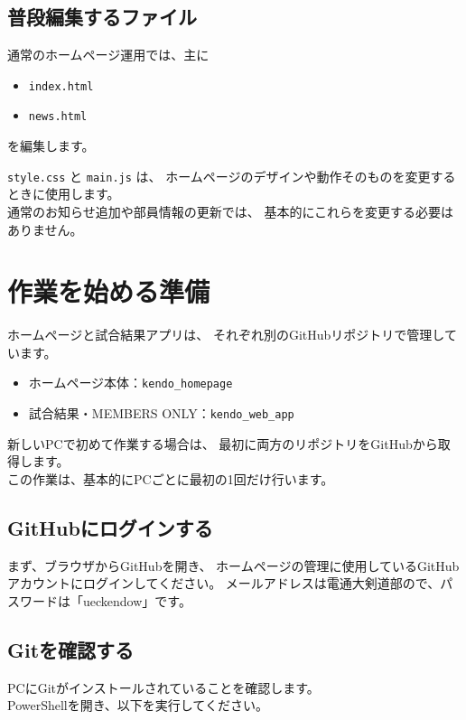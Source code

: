 \documentclass[a4paper,11pt]{ltjsarticle}
\begin{document}
\subsection{普段編集するファイル}

通常のホームページ運用では、主に

\begin{itemize}
  \item \texttt{index.html}
  \item \texttt{news.html}
\end{itemize}

を編集します。

\texttt{style.css} と \texttt{main.js} は、
ホームページのデザインや動作そのものを変更するときに使用します。\\
通常のお知らせ追加や部員情報の更新では、
基本的にこれらを変更する必要はありません。

\section{作業を始める準備}

ホームページと試合結果アプリは、
それぞれ別のGitHubリポジトリで管理しています。

\begin{itemize}
  \item ホームページ本体：\texttt{kendo\_homepage}
  \item 試合結果・MEMBERS ONLY：\texttt{kendo\_web\_app}
\end{itemize}

新しいPCで初めて作業する場合は、
最初に両方のリポジトリをGitHubから取得します。\\
この作業は、基本的にPCごとに最初の1回だけ行います。

\subsection{GitHubにログインする}

まず、ブラウザからGitHubを開き、 
ホームページの管理に使用しているGitHubアカウントにログインしてください。
メールアドレスは電通大剣道部ので、パスワードは「ueckendow」です。

\subsection{Gitを確認する}

PCにGitがインストールされていることを確認します。\\
PowerShellを開き、以下を実行してください。
\end{document}
